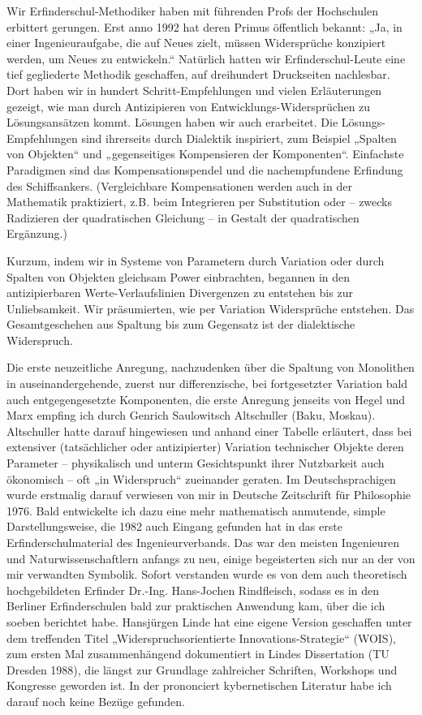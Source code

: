 \documentclass[11pt,a4paper]{article}
\begin{document}
Wir Erfinderschul-Methodiker haben mit führenden Profs der Hochschulen
erbittert gerungen. Erst anno 1992 hat deren Primus öffentlich bekannt: „Ja,
in einer Ingenieuraufgabe, die auf Neues zielt, müssen Widersprüche konzipiert
werden, um Neues zu entwickeln.“ Natürlich hatten wir Erfinderschul-Leute eine
tief gegliederte Methodik geschaffen, auf dreihundert Druckseiten nachlesbar.
Dort haben wir in hundert Schritt-Empfehlungen und vielen Erläuterungen
gezeigt, wie man durch Antizipieren von Entwicklungs-Widersprüchen zu
Lösungsansätzen kommt. Lösungen haben wir auch erarbeitet. Die
Lösungs-Empfehlungen sind ihrerseits durch Dialektik inspiriert, zum Beispiel
„Spalten von Objekten“ und „gegenseitiges Kompensieren der Komponenten“.
Einfachste Paradigmen sind das Kompensationspendel und die nachempfundene
Erfindung des Schiffsankers. (Vergleichbare Kompensationen werden auch in der
Mathematik praktiziert, z.B. beim Integrieren per Substitution oder -- zwecks
Radizieren der quadratischen Gleichung -- in Gestalt der quadratischen
Ergänzung.)

Kurzum, indem wir in Systeme von Parametern durch Variation oder durch Spalten
von Objekten gleichsam Power einbrachten, begannen in den antizipierbaren
Werte-Verlaufslinien Divergenzen zu entstehen bis zur Unliebsamkeit. Wir
präsumierten, wie per Variation Widersprüche entstehen. Das Gesamtgeschehen
aus Spaltung bis zum Gegensatz ist der dialektische Widerspruch.

Die erste neuzeitliche Anregung, nachzudenken über die Spaltung von Monolithen
in auseinandergehende, zuerst nur differenzische, bei fortgesetzter Variation
bald auch entgegengesetzte Komponenten, die erste Anregung jenseits von Hegel
und Marx empfing ich durch Genrich Saulowitsch Altschuller (Baku, Moskau).
Altschuller hatte darauf hingewiesen und anhand einer Tabelle erläutert, dass
bei extensiver (tatsächlicher oder antizipierter) Variation technischer
Objekte deren Parameter -- physikalisch und unterm Gesichtspunkt ihrer
Nutzbarkeit auch ökonomisch -- oft „in Widerspruch“ zueinander geraten. Im
Deutschsprachigen wurde erstmalig darauf verwiesen von mir in Deutsche
Zeitschrift für Philosophie 1976. Bald entwickelte ich dazu eine mehr
mathematisch anmutende, simple Darstellungsweise, die 1982 auch Eingang
gefunden hat in das erste Erfinderschulmaterial des Ingenieurverbands. Das war
den meisten Ingenieuren und Naturwissenschaftlern anfangs zu neu, einige
begeisterten sich nur an der von mir verwandten Symbolik. Sofort verstanden
wurde es von dem auch theoretisch hochgebildeten Erfinder Dr.-Ing. Hans-Jochen
Rindfleisch, sodass es in den Berliner Erfinderschulen bald zur praktischen
Anwendung kam, über die ich soeben berichtet habe. Hansjürgen Linde hat eine
eigene Version geschaffen unter dem treffenden Titel „Widerspruchsorientierte
Innovations-Strategie“ (WOIS), zum ersten Mal zusammenhängend dokumentiert in
Lindes Dissertation (TU Dresden 1988), die längst zur Grundlage zahlreicher
Schriften, Workshops und Kongresse geworden ist. In der prononciert
kybernetischen Literatur habe ich darauf noch keine Bezüge gefunden.
\end{document}
